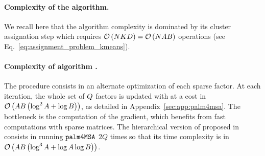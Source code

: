 
\paragraph{Complexity of the \kmeans algorithm.}
We recall here that the \kmeans algorithm complexity is dominated by its cluster assignation step which requires $\mathcal{O}\left (NKD\right )=\mathcal{O}\left (N A B\right )$ operations (see Eq.~\eqref{eq:assignment_problem_kmeans}).

\paragraph{Complexity of algorithm \palm.} The procedure consists in an alternate optimization of each sparse factor. 
At each iteration, the whole set of $Q$ factors is updated with at a cost in $\mathcal{O}\left (AB\left (\log^2 A+\log B\right )\right )$, as detailed in Appendix~\ref{sec:app:palm4msa}. 
The bottleneck is the computation of the gradient, which benefits from fast computations with sparse matrices.
The hierarchical version of \palm proposed in~\cite{LeMagoarou2016Flexible} consists in running $\texttt{palm4MSA}$ $2Q$ times so that its time complexity is in $\mathcal{O}\left (AB\left (\log^3 A + \log A \log B\right )\right )$.

